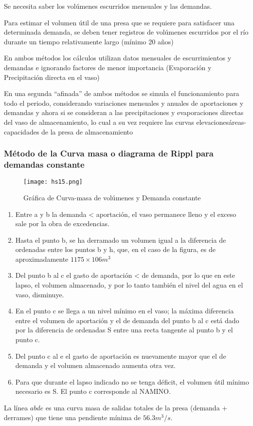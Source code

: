 Se necesita saber los volúmenes escurridos mensuales y las demandas.

Para estimar el volumen útil de una presa que se requiere para satisfacer una determinada demanda, se deben tener registros de volúmenes escurridos por el río durante un tiempo relativamente largo (mínimo 20 años)

En ambos métodos los cálculos utilizan datos mensuales de escurrimientos y demandas e ignorando factores de menor importancia (Evaporación y Precipitación directa en el vaso)

En una segunda ``afinada'' de ambos métodos se simula el funcionamiento para todo el periodo, considerando variaciones mensuales y anuales de aportaciones y demandas y ahora si se consideran a las precipitaciones y evaporaciones directas del vaso de almacenamiento, lo cual a su vez requiere las curvas elevacionesáreas-capacidades de la presa de almacenamiento

\subsubsection{Método de la Curva masa o diagrama de Rippl para demandas constante}
\begin{figure}[h!]
\centering
  \texttt{[image: hs15.png]}
  \caption{Gráfica de Curva-masa de volúmenes y Demanda constante}
  \label{}
\end{figure}\begin{enumerate}
    \item Entre a y b la demanda < aportación, el vaso permanece lleno y el exceso sale por la obra de excedencias.
    \item Hasta el punto b, se ha derramado un volumen igual a la diferencia de ordenadas entre los puntos b y h, que, en el caso de la figura, es de aproximadamente $1 175 \times  106 m^3$
    \item Del punto b al c el gasto de aportación < de demanda, por lo que en este lapso, el volumen almacenado, y por lo tanto también el nivel del agua en el vaso, disminuye.
    \item En el punto c se llega a un nivel mínimo en el vaso; la máxima diferencia entre el volumen de aportación y el de demanda del punto b al c está dado por la diferencia de ordenadas S entre una recta tangente al punto b y el punto c.
    \item Del punto c al e el gasto de aportación es nuevamente mayor que el de demanda y el volumen almacenado aumenta otra vez.
    \item Para que durante el lapso indicado no se tenga déficit, el volumen útil mínimo necesario es S. El punto c corresponde al NAMINO.
\end{enumerate}
La línea $abde$ es una curva masa de salidas totales de la presa (demanda + derrames) que tiene una pendiente mínima de $56.3 m^3/s$.
